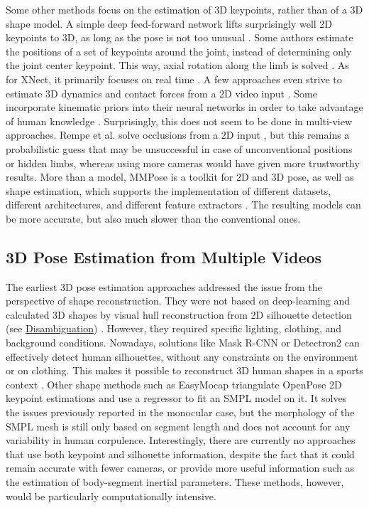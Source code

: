 Some other methods focus on the estimation of 3D keypoints, rather than of a 3D shape model. A simple deep feed-forward network lifts surprisingly well 2D keypoints to 3D, as long as the pose is not too unusual \cite{Martinez2017}. Some authors estimate the positions of a set of keypoints around the joint, instead of determining only the joint center keypoint. This way, axial rotation along the limb is solved \cite{Fisch2020}. As for XNect, it primarily focuses on real time \cite{Mehta2020}. A few approaches even strive to estimate 3D dynamics and contact forces from a 2D video input \cite{Li2019,Rempe2021,Louis2022}. Some incorporate kinematic priors into their neural networks in order to take advantage of human knowledge \cite{Xu2020a}. Surprisingly, this does not seem to be done in multi-view approaches. Rempe et al. solve occlusions from a 2D input \cite{Rempe2020}, but this remains a probabilistic guess that may be unsuccessful in case of unconventional positions or hidden limbs, whereas using more cameras would have given more trustworthy results. More than a model, MMPose is a toolkit for 2D and 3D pose, as well as shape estimation, which supports the implementation of different datasets, different architectures, and different feature extractors \cite{MMPose2020}. The resulting models can be more accurate, but also much slower than the conventional ones.


\subsection{3D Pose Estimation from Multiple Videos}

The earliest 3D pose estimation approaches addressed the issue from the perspective of shape reconstruction. They were not based on deep-learning and calculated 3D shapes by visual hull reconstruction from 2D silhouette detection (see \hyperlink{Ann:gloss}{Disambiguation}) \cite{Cheung2003,Corazza2006}. However, they required specific lighting, clothing, and background conditions. Nowadays, solutions like Mask R-CNN \cite{He2017} or Detectron2 \cite{Wu2019} can effectively detect human silhouettes, without any constraints on the environment or on clothing. This makes it possible to reconstruct 3D human shapes in a sports context \cite{Chen2019}. Other shape methods such as EasyMocap \cite{Easymocap2021} triangulate OpenPose 2D keypoint estimations and use a regressor to fit an SMPL model on it. It solves the issues previously reported in the monocular case, but the morphology of the SMPL mesh is still only based on segment length and does not account for any variability in human corpulence. Interestingly, there are currently no approaches that use both keypoint and silhouette information, despite the fact that it could remain accurate with fewer cameras, or provide more useful information such as the estimation of body-segment inertial parameters. These methods, however, would be particularly computationally intensive.

